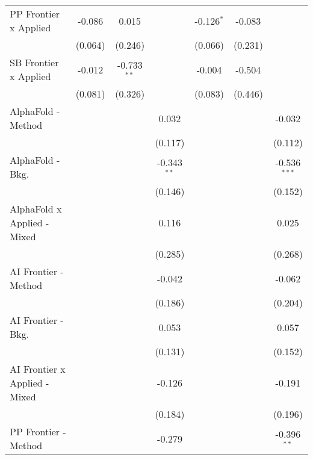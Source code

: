 \begin{tabular}{lcccccc}
   PP Frontier x Applied          & -0.086        & 0.015         &               & -0.126$^{*}$  & -0.083  &   \\   
                                  & (0.064)       & (0.246)       &               & (0.066)       & (0.231) &   \\   
   SB Frontier x Applied          & -0.012        & -0.733$^{**}$ &               & -0.004        & -0.504  &   \\   
                                  & (0.081)       & (0.326)       &               & (0.083)       & (0.446) &   \\   
   AlphaFold - Method             &               &               & 0.032         &               &         & -0.032\\   
                                  &               &               & (0.117)       &               &         & (0.112)\\   
   AlphaFold - Bkg.               &               &               & -0.343$^{**}$ &               &         & -0.536$^{***}$\\   
                                  &               &               & (0.146)       &               &         & (0.152)\\   
   AlphaFold x Applied - Mixed    &               &               & 0.116         &               &         & 0.025\\   
                                  &               &               & (0.285)       &               &         & (0.268)\\   
   AI Frontier - Method           &               &               & -0.042        &               &         & -0.062\\   
                                  &               &               & (0.186)       &               &         & (0.204)\\   
   AI Frontier - Bkg.             &               &               & 0.053         &               &         & 0.057\\   
                                  &               &               & (0.131)       &               &         & (0.152)\\   
   AI Frontier x Applied - Mixed  &               &               & -0.126        &               &         & -0.191\\   
                                  &               &               & (0.184)       &               &         & (0.196)\\   
   PP Frontier - Method           &               &               & -0.279        &               &         & -0.396$^{**}$\\   

\end{tabular}
